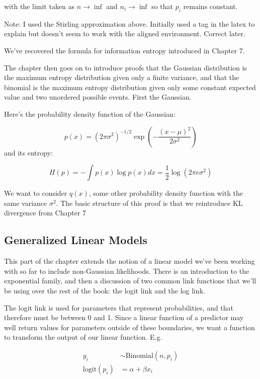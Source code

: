 \documentclass[
]{book}
\begin{document}
with the limit taken as \(n \to \inf\) and \(n_i \to \inf\) so that \(p_i\) remains constant.

Note: I used the Stirling approximation above. Initially used a tag in the latex to explain but doesn't seem to work with the aligned environment. Correct later.

We've recovered the formula for information entropy introduced in Chapter 7.

The chapter then goes on to introduce proofs that the Gaussian distribution is the maximum entropy distribution given only a finite variance, and that the binomial is the maximum entropy distribution given only some constant expected value and two unordered possible events. First the Gaussian.

Here's the probability density function of the Gaussian:

\[
p(x) = (2 \pi \sigma^2)^{-1/2} \exp \left( - \frac{(x- \mu)^2}{2 \sigma^2} \right)
\]
and its entropy:

\[
H(p) = - \int p(x) \log p(x) dx = \frac{1}{2} \log(2 \pi e \sigma^2) 
\]

We want to consider \(q(x)\), some other probability density function with the same variance \(\sigma^2\). The basic structure of this proof is that we reintroduce KL divergence from Chapter 7

\hypertarget{generalized-linear-models}{%
\subsection*{Generalized Linear Models}\label{generalized-linear-models}}

This part of the chapter extends the notion of a linear model we've been working with so far to include non-Gaussian likelihoods. There is an introduction to the exponential family, and then a discussion of two common link functions that we'll be using over the rest of the book: the logit link and the log link.

The logit link is used for parameters that represent probabilities, and that therefore must be between 0 and 1. Since a linear function of a predictor may well return values for parameters outside of these boundaries, we want a function to transform the output of our linear function. E.g.

\[
\begin{aligned}
y_i &\sim \text{Binomial}(n,p_i) \\
\text{logit}(p_i) &= \alpha + \beta x_i
\end{aligned}
\]
\end{document}
